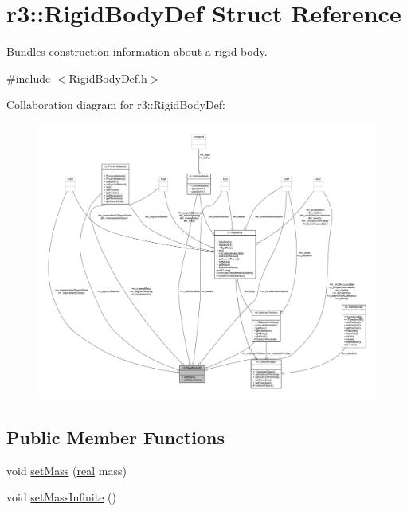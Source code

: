\hypertarget{structr3_1_1_rigid_body_def}{}\section{r3\+:\+:Rigid\+Body\+Def Struct Reference}
\label{structr3_1_1_rigid_body_def}


Bundles construction information about a rigid body.  




{\ttfamily \#include $<$Rigid\+Body\+Def.\+h$>$}



Collaboration diagram for r3\+:\+:Rigid\+Body\+Def\+:\nopagebreak
\begin{figure}[H]
\begin{center}
\leavevmode
\includegraphics[width=350pt]{structr3_1_1_rigid_body_def__coll__graph}
\end{center}
\end{figure}
\subsection*{Public Member Functions}
\begin{DoxyCompactItemize}
\item 
void \mbox{\hyperlink{structr3_1_1_rigid_body_def_a7b84fd988312a41f84ac0505f6c3de47}{set\+Mass}} (\mbox{\hyperlink{namespacer3_ab2016b3e3f743fb735afce242f0dc1eb}{real}} mass)
\item 
void \mbox{\hyperlink{structr3_1_1_rigid_body_def_a6912018eac59c46be887cf07e7aadc36}{set\+Mass\+Infinite}} ()
\end{DoxyCompactItemize}
